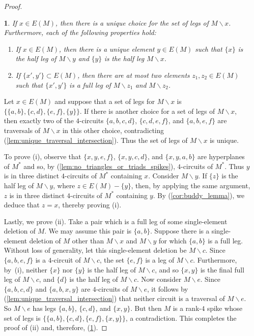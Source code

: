 \documentclass[11pt]{amsart}
\newtheorem{sublemma}{}[theorem]
\numberwithin{equation}{section} %
\begin{document}
\begin{proof}
\begin{sublemma}
\label{lem:spike_representations}
If $x\in E(M)$, then there is a unique choice for the set of legs of $M\backslash x$. Furthermore, each of the following properties hold:
\begin{enumerate}[{\rm (i)}]
\item If $x\in E(M)$, then there is a unique element $y\in E(M)$ such that $\{x\}$ is the half leg of $M\backslash y$ and $\{y\}$ is the half leg $M\backslash x$.

\item If $\{x', y'\}\subset E(M)$, then there are at most two elements $z_1, z_2\in E(M)$ such that $\{x', y'\}$ is a full leg of $M\backslash z_1$ and $M\backslash z_2$.
\end{enumerate}
\end{sublemma}

Let $x\in E(M)$ and suppose that a set of legs for $M\backslash x$ is $\{\{a, b\}, \{c, d\}, \{e, f\}, \{y\}\}$. If there is another choice for a set of legs of $M\backslash x$, then exactly two of the $4$-circuits $\{a, b, c, d\}$, $\{c, d, e, f\}$, and $\{a, b, e, f\}$ are traversals of $M\backslash x$ in this other choice, contradicting (\ref{lem:unique_traversal_intersection}). Thus the set of legs of $M\backslash x$ is unique.

To prove (i), observe that $\{x, y, e, f\}$, $\{x, y, c, d\}$, and $\{x, y, a, b\}$ are hyperplanes of $M^*$ and so, by (\ref{lem:no_triangles_or_triads_spikes}), $4$-circuits of $M^*$. Thus $y$ is in three distinct $4$-circuits of $M^*$ containing $x$. Consider $M\backslash y$. If $\{z\}$ is the half leg of $M\backslash y$, where $z\in E(M)-\{y\}$, then, by applying the same argument, $z$ is in three distinct $4$-circuits of $M^*$ containing $y$. By (\ref{cor:buddy_lemma}), we deduce that $z=x$, thereby proving (i). 

Lastly, we prove (ii). Take a pair which is a full leg of some single-element deletion of $M$. We may assume this pair is $\{a,b\}$. Suppose there is a single-element deletion of $M$ other than $M \backslash x$ and $M \backslash y$ for which $\{a,b\}$ is a full leg. Without loss of generality, let this single-element deletion be $M \backslash c$. Since $\{a, b, e, f\}$ is a $4$-circuit of $M\backslash c$, the set $\{e, f\}$ is a leg of $M\backslash c$. Furthermore, by~(i), neither $\{x\}$ nor $\{y\}$ is the half leg of $M\backslash c$, and so $\{x, y\}$ is the final full leg of $M\backslash c$, and $\{d\}$ is the half leg of $M\backslash c$. Now consider $M\backslash e$. Since $\{a, b, c, d\}$ and $\{a, b, x, y\}$ are $4$-circuits of $M\backslash e$, it follows by (\ref{lem:unique_traversal_intersection}) that neither circuit is a traversal of $M\backslash e$. So $M\backslash e$ has legs $\{a, b\}$, $\{c, d\}$, and $\{x, y\}$. But then $M$ is a rank-$4$ spike whose set of legs is $\{\{a, b\}, \{c, d\}, \{e, f\}, \{x, y\}\}$, a contradiction. This completes the proof of (ii) and, therefore, (\ref{lem:spike_representations}).


\end{proof}
\end{document}
